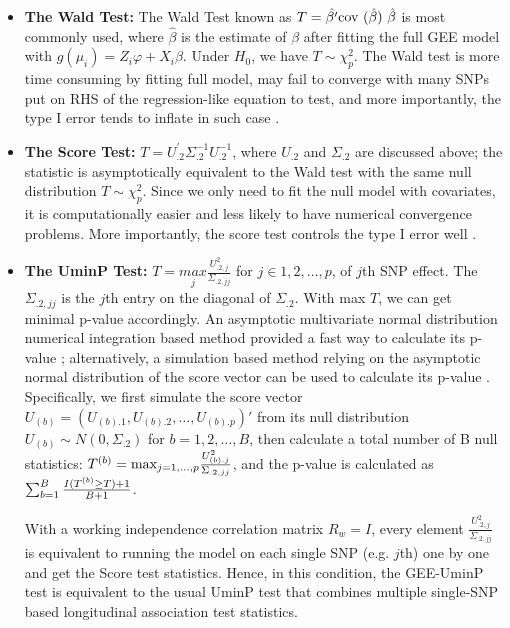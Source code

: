 \documentclass[12pt]{article}
\begin{document}
\begin{itemize}
\item \textbf{The Wald Test:} The Wald Test known as $T=\hat{\beta'}\text{cov (\ensuremath{\hat{\beta}}) }\hat{\beta}$ is most commonly used, where $\hat{\beta}$ is the estimate of $\beta$ after fitting the full GEE model with $g(\mu_i) = Z_i\varphi + X_i \beta$. Under $H_0$, we have $T \sim \chi_{p}^2$. The Wald test is more time consuming by fitting full model, may fail to converge with many SNPs put on RHS of the regression-like equation to test, and more importantly, the type I error tends to inflate in such case \cite{pan2014powerful,zhang2014testing}.
\item \textbf{The Score Test:} $T=U_{.2}^{'}\Sigma_{.2}^{-1}U_{.2}^{-1}$, where $U_{.2}$ and $\Sigma_{.2}$ are discussed above; the statistic is asymptotically equivalent to the Wald test with the same null distribution $T \sim \chi_{p}^2$. Since we only need to fit the null model with covariates, it is computationally easier and less likely to have numerical convergence
problems. More importantly, the score test controls the type I error well \cite{pan2014powerful,zhang2014testing}.
\item \textbf{The UminP Test: }$T=\underset{j}{max}\frac{U_{.2,j}^{2}}{\Sigma_{.2,jj}}$
for $j\in 1,2,\dots,p$, of $j$th SNP effect. The $\Sigma_{.2,jj}$ is the $j$th entry on the diagonal of $\Sigma_{.2}$. With max $T$, we can get minimal p-value accordingly. An asymptotic multivariate normal distribution numerical integration based method provided a fast way to calculate its p-value \cite{Pan2009a,Pan2009}; alternatively, a simulation based method relying on the asymptotic normal distribution of the score vector can be used to calculate its p-value \cite{pan2014powerful,zhang2014testing}. Specifically, we first simulate the score vector $U_{(b)} = ( U_{(b).1}, U_{(b).2},\ldots, U_{(b).p} )'$ from its null distribution  $U_{(b)} \sim N(0, \Sigma_{.2} )$ for $b = 1, 2, \ldots, B$, then calculate a total number of B null statistics: $T^{(b)} = \textrm{max}_{j = 1,\ldots,p} { U^2_{(b).j} \over  \Sigma_{.2,jj} }$, and the p-value is calculated as $\sum_{b=1}^B { I(T^{(b)} \geq T ) + 1  \over B + 1 } $.

With a working independence correlation matrix $R_w = I$, every element $\frac{U_{.2,j}^{2}}{\Sigma_{.2,jj}}$ is equivalent to running the model on each single SNP (e.g. $j$th) one by one and get the Score test statistics. Hence, in this condition, the GEE-UminP test is equivalent to the usual UminP test that combines multiple single-SNP based longitudinal association test statistics.
\end{itemize}
\end{document}
